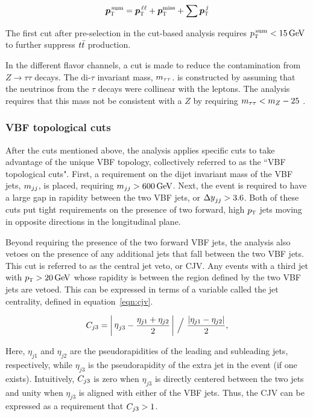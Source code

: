 \begin{equation}
\hbox{\bm{$p$}}_{\textrm{\footnotesize\sc t}}^{\,\rm sum} = \hbox{\bm{$p$}}_{\textrm{\footnotesize\sc t}}^{\,\ell\ell} + \hbox{\bm{$p$}}_{\textrm{\footnotesize\sc t}}^{\rm miss} + \sum \hbox{\bm{$p$}}_{\textrm{\footnotesize\sc t}}^{\,j}
\label{eqn:pttot}
\end{equation} 

The first cut after pre-selection in the cut-based analysis requires $\pTtot < 15 \GeV$ to further suppress $t\bar{t}$ production.  

In the different flavor channels, a cut is made to reduce the contamination from $Z\to\tau\tau$ decays. The di-$\tau$ invariant mass, $m_{\tau\tau}$. is constructed by assuming that the neutrinos from the $\tau$ decays were collinear with the leptons\cite{collinear}. The analysis requires that this mass not be consistent with a $Z$ by requiring $m_{\tau\tau} < m_Z - 25$ \GeV. 

\subsubsection{VBF topological cuts}
\label{sec:vbf_topocuts}
After the cuts mentioned above, the analysis applies specific cuts to take advantage of the unique VBF topology, collectively referred to as the ``VBF topological cuts". First, a requirement on the dijet invariant mass of the VBF jets, $m_{jj}$, is placed, requiring $\mjj > 600 \GeV$. Next, the event is required to have a large gap in rapidity between the two VBF jets, or $\dyjj > 3.6$. Both of these cuts put tight requirements on the presence of two forward, high $p_{\textrm{\footnotesize\sc t}}$ jets moving in opposite directions in the longitudinal plane. 

Beyond requiring the presence of the two forward VBF jets, the analysis also vetoes on the presence of any additional jets that fall between the two VBF jets. This cut is referred to as the central jet veto, or CJV. Any events with a third jet with $\pT > 20 \GeV$ whose rapidity is between the region defined by the two VBF jets are vetoed. This can be expressed in terms of a variable called the jet centrality, defined in equation~\ref{eqn:cjv}.

\begin{equation}
\cjv = \bigg|\, \etathirdjet - \frac{\eta_{j1} + \eta_{j2}}{2} \,\bigg|\ \Big/\ \frac{\left|\eta_{j1} - \eta_{j2}\right|}{2},
\label{eqn:cjv}
\end{equation}

Here, $\eta_{j1}$ and $\eta_{j2}$ are the pseudorapidities of the leading and subleading jets, respectively, while $\eta_{j3}$ is the pseudorapidity of the extra jet in the event (if one exists). Intuitively, $C_{j3}$ is zero when $\eta_{j3}$ is directly centered between the two jets and unity when $\eta_{j3}$ is aligned with either of the VBF jets. Thus, the CJV can be expressed as a requirement that $C_{j3} > 1$. 


